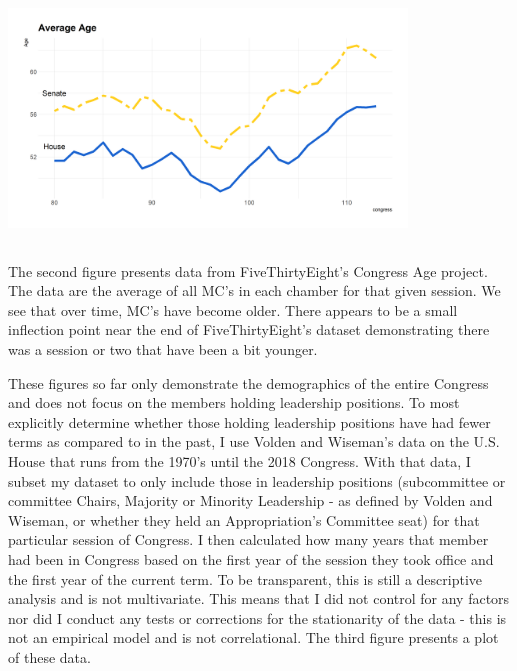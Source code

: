 \documentclass [12pt]{article}
\begin{document}
{{\includegraphics[height=250, width=400]{../figures/age-over-time}

The second figure presents data from FiveThirtyEight's Congress Age project. The data are the average of all MC's in each chamber for that given session. We see that over time, MC's have become older. There appears to be a small inflection point near the end of FiveThirtyEight's dataset demonstrating there was a session or two that have been a bit younger.

These figures so far only demonstrate the demographics of the entire Congress and does not focus on the members holding leadership positions. To most explicitly determine whether those holding leadership positions have had fewer terms as compared to in the past, I use Volden and Wiseman's data on the U.S. House that runs from the 1970's until the 2018 Congress. With that data, I subset my dataset to only include those in leadership positions (subcommittee or committee Chairs, Majority or Minority Leadership - as defined by Volden and Wiseman, or whether they held an Appropriation's Committee seat) for that particular session of Congress. I then calculated how many years that member had been in Congress based on the first year of the session they took office and the first year of the current term. To be transparent, this is still a descriptive analysis and is not multivariate. This means that I did not control for any factors nor did I conduct any tests or corrections for the stationarity of the data - this is not an empirical model and is not correlational. The third figure presents a plot of these data.

}}
\end{document}
